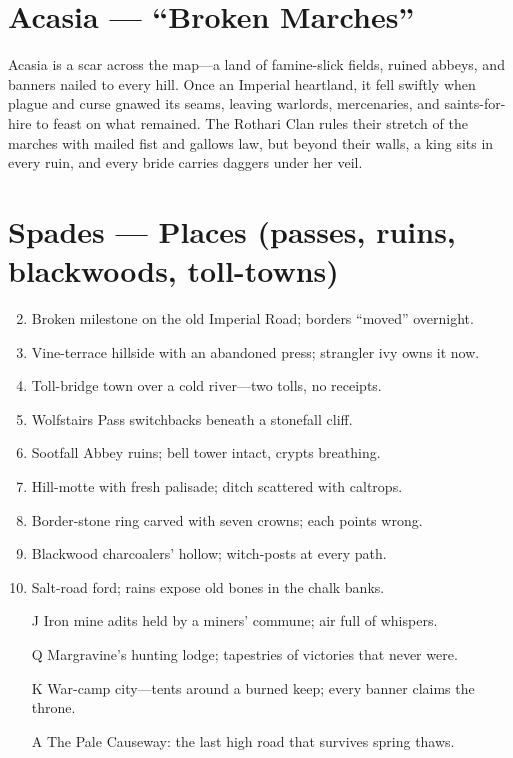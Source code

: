\section{Acasia --- ``Broken Marches''}
\label{chap:acasia}

Acasia is a scar across the map---a land of famine-slick fields, ruined abbeys, and banners nailed to every hill. Once an Imperial heartland, it fell swiftly when plague and curse gnawed its seams, leaving warlords, mercenaries, and saints-for-hire to feast on what remained. The Rothari Clan rules their stretch of the marches with mailed fist and gallows law, but beyond their walls, a king sits in every ruin, and every bride carries daggers under her veil.

\section*{Spades --- Places (passes, ruins, blackwoods, toll-towns)}
\label{sec:acasia-places}
\begin{enumerate}
\setcounter{enumi}{1}
\item Broken milestone on the old Imperial Road; borders ``moved'' overnight.
\item Vine-terrace hillside with an abandoned press; strangler ivy owns it now.
\item Toll-bridge town over a cold river---two tolls, no receipts.
\item Wolfstairs Pass switchbacks beneath a stonefall cliff.
\item Sootfall Abbey ruins; bell tower intact, crypts breathing.
\item Hill-motte with fresh palisade; ditch scattered with caltrops.
\item Border-stone ring carved with seven crowns; each points wrong.
\item Blackwood charcoalers' hollow; witch-posts at every path.
\item Salt-road ford; rains expose old bones in the chalk banks.
\item[J] Iron mine adits held by a miners' commune; air full of whispers.
\item[Q] Margravine's hunting lodge; tapestries of victories that never were.
\item[K] War-camp city---tents around a burned keep; every banner claims the throne.
\item[A] The Pale Causeway: the last high road that survives spring thaws.
\end{enumerate}

